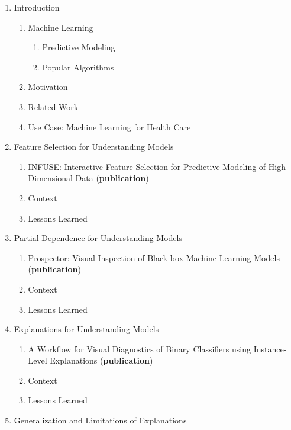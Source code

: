 \begin{enumerate}[label*=\arabic*.]
    \item Introduction
    \begin{enumerate}[label*=\arabic*.]
        \item Machine Learning
        \begin{enumerate}[label*=\arabic*.]
            \item Predictive Modeling
            \item Popular Algorithms
        \end{enumerate}
        \item Motivation
        \item Related Work
        \item Use Case: Machine Learning for Health Care
    \end{enumerate}
    \item Feature Selection for Understanding Models
    \begin{enumerate}[label*=\arabic*.]
        \item INFUSE: Interactive Feature Selection for Predictive Modeling of High Dimensional Data (\textbf{publication}) ~\cite{infuse}
        \item Context
        \item Lessons Learned
    \end{enumerate}
    \item Partial Dependence for Understanding Models
    \begin{enumerate}[label*=\arabic*.]
        \item Prospector: Visual Inspection of Black-box Machine Learning Models (\textbf{publication}) ~\cite{prospector16}
        \item Context
        \item Lessons Learned
    \end{enumerate}
    \item Explanations for Understanding Models
    \begin{enumerate}[label*=\arabic*.]
        \item A Workflow for Visual Diagnostics of Binary Classifiers using Instance-Level Explanations (\textbf{publication}) ~\cite{explainer}
        \item Context
        \item Lessons Learned
    \end{enumerate}
    \item Generalization and Limitations of Explanations
    \begin{enumerate}[label*=\arabic*.]

\end{enumerate}
\end{enumerate}
